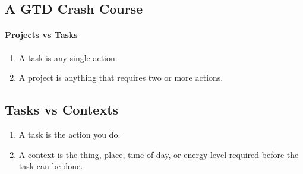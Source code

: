 \documentclass{tufte-handout}
\begin{document}
\subsection{A GTD Crash Course}
\label{gtd-crash-course}

\paragraph{Projects vs Tasks}
\label{sec:proj-tasks}

\begin{enumerate} \itemsep -.3em
\item[] A task is any single action.
\item[] A project is anything that requires two or more actions.
\end{enumerate}




\subsection{Tasks vs Contexts}
\label{tasks-contexts}

\begin{enumerate} \itemsep -0.3em
  \item[] A task is the action you do.
  \item[] A context is the thing, place, time of day, or energy level required before the task can be done.
\end{enumerate}

\end{document}
